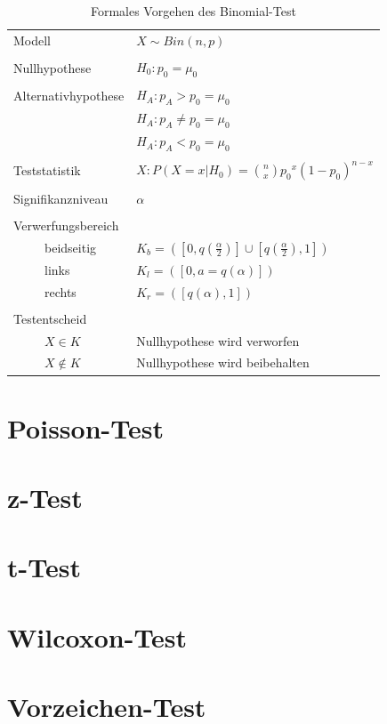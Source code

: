 \begin{table}[h!]
	\begin{tabular}{l l}
		Modell 
			& $X \sim Bin(n,p)$ \\
		& \\
		Nullhypothese
			& $H_0: p_0 = \mu_0$ \\
		& \\
		Alternativhypothese 
			& $H_A: p_A > p_0 = \mu_0$ \\
			& $H_A: p_A \neq p_0 = \mu_0$ \\ 
			& $H_A: p_A < p_0 = \mu_0$ \\
		& \\
		Teststatistik
			& $X: P(X=x|H_0) = \binom{n}{x} {p_0}^x (1-p_0)^{n-x}$ \\
		& \\
		Signifikanzniveau
			& $\alpha$ \\
		& \\
		Verwerfungsbereich
			& \\
		~~~~~beidseitig
			& $K_b = \left(\left[
					0,q\left(\frac{\alpha}{2}\right)
				\right] \cup 
				\left[
					q\left(\frac{\alpha}{2}\right),1
				\right]\right)$ \\ 
		~~~~~links
			& $K_l = \left(\left[
					0, a = q\left(\alpha
				\right)\right]\right)$ \\
		~~~~~rechts
			& $K_r = \left(\left[ 
					q\left(\alpha\right),1
				\right]\right)$ \\
		& \\
		Testentscheid
			& \\
		~~~~~$X \in K$
			& Nullhypothese wird verworfen \\
		~~~~~$X \not\in K$
			& Nullhypothese wird beibehalten \\ 
	\end{tabular}
	\caption{Formales Vorgehen des Binomial-Test}
\end{table}

\section{Poisson-Test}
\section{z-Test}
\section{t-Test}
\section{Wilcoxon-Test}
\section{Vorzeichen-Test}

